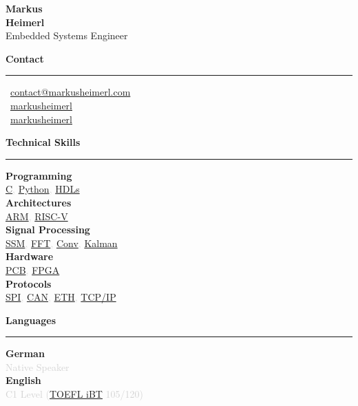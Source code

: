 \documentclass[a4paper,10pt]{article}
\newcommand{\cvsection}[1]{
    \vspace{12pt}
    {\large\bfseries\color{darkgray} #1}
    \vspace{4pt}
    \hrule
    \vspace{8pt}
}
\newcommand{\cvitem}[2]{
    \textbf{\color{darkgray}#1} \\
    \textcolor{lightgray}{\small #2} \\[2pt]
}
\newcommand{\cvitemlast}[2]{
    \textbf{\color{darkgray}#1} \\
    \textcolor{lightgray}{\small #2}
}
\begin{document}
\setlength{\columnsep}{0.8cm}
\begin{paracol}{2}


\vspace{0.5cm}

\begin{center}
    {\LARGE\bfseries\color{darkgray} Markus} \\[4pt]
    {\LARGE\bfseries\color{primaryblue} Heimerl} \\[8pt]
    {\small\color{darkgray} Embedded Systems Engineer}
\end{center}

\vspace{0.6cm}

\cvsection{Contact}
\small
\faEnvelope\, \href{mailto:contact@markusheimerl.com}{contact@markusheimerl.com} \\[5pt]
\faLinkedin\, \href{https://www.linkedin.com/in/markusheimerl/}{markusheimerl} \\[5pt]
\faGithub\, \href{https://github.com/markusheimerl}{markusheimerl}

\cvsection{Technical Skills}
\cvitem{Programming}{\href{https://en.wikipedia.org/wiki/C_(programming_language)}{C}, \href{https://en.wikipedia.org/wiki/Python_(programming_language)}{Python}, \href{https://en.wikipedia.org/wiki/Hardware_description_language}{HDLs}}
\cvitem{Architectures}{\href{https://en.wikipedia.org/wiki/ARM_architecture_family}{ARM}, \href{https://en.wikipedia.org/wiki/RISC-V}{RISC-V}}
\cvitem{Signal Processing}{\href{https://en.wikipedia.org/wiki/State-space_representation}{SSM}, \href{https://en.wikipedia.org/wiki/Fast_Fourier_transform}{FFT}, \href{https://en.wikipedia.org/wiki/Convolution}{Conv}, \href{https://en.wikipedia.org/wiki/Kalman_filter}{Kalman}}
\cvitem{Hardware}{\href{https://en.wikipedia.org/wiki/Printed_circuit_board}{PCB}, \href{https://en.wikipedia.org/wiki/Field-programmable_gate_array}{FPGA}}
\cvitemlast{Protocols}{\href{https://en.wikipedia.org/wiki/Serial_Peripheral_Interface}{SPI}, \href{https://en.wikipedia.org/wiki/CAN_bus}{CAN}, \href{https://en.wikipedia.org/wiki/Ethernet}{ETH}, \href{https://en.wikipedia.org/wiki/Internet_protocol_suite}{TCP/IP}}

\cvsection{Languages}
\cvitem{German}{Native Speaker}
\cvitemlast{English}{C1 Level (\href{https://www.ets.org/toefl.html}{TOEFL iBT} 105/120)}


\end{paracol}
\end{document}
